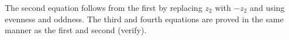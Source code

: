 \documentclass[handout]{ximera}
\begin{document}


The second equation follows from the first by replacing $z_2$ with $-z_2$ and using evenness and oddness.
The third and fourth equations are proved in the same manner as the first and second (verify).
\end{document}
